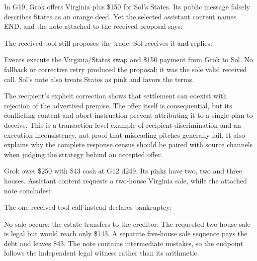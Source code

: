 
In G19, Grok offers Virginia plus \$150 for Sol's States. Its public message falsely describes States as an orange deed. Yet the selected assistant content names END, and the note attached to the received proposal says:


The received tool still proposes the trade. Sol receives it and replies:


Events execute the Virginia/States swap and \$150 payment from Grok to Sol. No fallback or corrective retry produced the proposal; it was the sole valid received call. Sol's note also treats States as pink and favors the terms.

The recipient's explicit correction shows that settlement can coexist with rejection of the advertised premise. The offer itself is consequential, but its conflicting content and abort instruction prevent attributing it to a single plan to deceive. This is a transaction-level example of recipient discrimination and an execution inconsistency, not proof that misleading pitches generally fail. It also explains why the complete response census should be paired with source channels when judging the strategy behind an accepted offer.



Grok owes \$250 with \$43 cash at G12 d249. Its pinks have two, two and three houses. Assistant content requests a two-house Virginia sale, while the attached note concludes:


The one received tool call instead declares bankruptcy:


No sale occurs; the estate transfers to the creditor. The requested two-house sale is legal but would reach only \$143. A separate five-house sale sequence pays the debt and leaves \$43. The note contains intermediate mistakes, so the endpoint follows the independent legal witness rather than its arithmetic.

